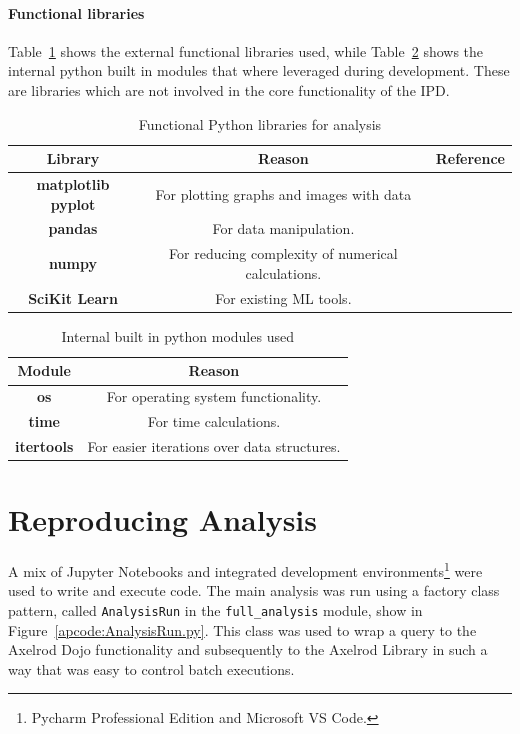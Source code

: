 \paragraph{Functional libraries}
Table~\ref{table:functionalLibrares} shows the external functional libraries used, while Table~\ref{table:builtinmodules} shows the internal python built in modules that where leveraged during development.
These are libraries which are not involved in the core functionality of the IPD\@.
\begin{table}[ht]
    \centering
    \begin{tabular}{ccc}
        \toprule
        Library & Reason & Reference\\
        \midrule
        \textbf{matplotlib pyplot} & For plotting graphs and images with data & \cite{hunter2007matplotlib}\\
        \textbf{pandas} & For data manipulation. & \cite{PandasGithub,Mckinney2010pandas}\\
        \textbf{numpy} & For reducing complexity of numerical calculations.& \cite{oliphant2006numpy}\\
        \textbf{SciKit Learn} & For existing ML tools. & \cite{pedregosa2011scikit}\\
        \bottomrule
    \end{tabular}
    \caption{Functional Python libraries for analysis}\label{table:functionalLibrares}
\end{table}
\begin{table}[ht]
    \centering
    \begin{tabular}{cc}
        \toprule
        Module & Reason\\
        \midrule
        \textbf{os} & For operating system functionality.\\
        \textbf{time} & For time calculations.\\
        \textbf{itertools} & For easier iterations over data structures.\\
        \bottomrule
    \end{tabular}
    \caption{Internal built in python modules used}\label{table:builtinmodules}
\end{table}

\section{Reproducing Analysis}\label{subsec:settingUpAResearchEnvironment}
A mix of Jupyter Notebooks and integrated development environments\footnote{Pycharm Professional Edition and Microsoft VS Code.} were used to write and execute code.
The main analysis was run using a factory class pattern, called \texttt{AnalysisRun} in the \texttt{full_analysis} module, show in Figure~\ref{apcode:AnalysisRun.py}.
This class was used to wrap a query to the Axelrod Dojo functionality and subsequently to the Axelrod Library in such a way that was easy to control batch executions.

